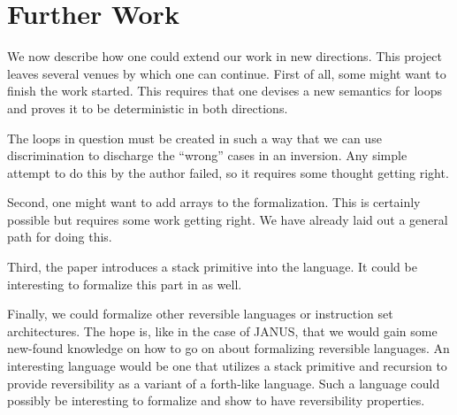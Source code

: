\chapter{Further Work}

We now describe how one could extend our work in new directions. This
project leaves several venues by which one can continue. First of all,
some might want to finish the work started. This requires that one
devises a new semantics for loops and proves it to be deterministic in
both directions.

The loops in question must be created in such a way that we can use
discrimination to discharge the ``wrong'' cases in an inversion. Any
simple attempt to do this by the author failed, so it requires some
thought getting right.

Second, one might want to add arrays to the formalization. This is
certainly possible but requires some work getting right. We have
already laid out a general path for doing this.

Third, the paper \cite{yokoyama.axelsen.ea:principles} introduces a
stack primitive into the language. It could be interesting to
formalize this part in \coq{} as well.

Finally, we could formalize other reversible languages or instruction
set architectures. The hope is, like in the case of JANUS, that we
would gain some new-found knowledge on how to go on about formalizing
reversible languages. An interesting language would be one that
utilizes a stack primitive and recursion to provide reversibility as a
variant of a forth-like language. Such a language could possibly be
interesting to formalize and show to have reversibility properties.

